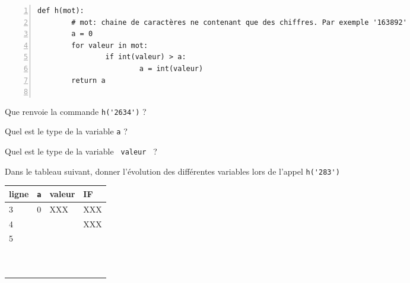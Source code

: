 \documentclass[a4paper,12pt,openany]{book}
\begin{document}
\begin{minipage}{9cm}
\begin{lstlisting}[numbers=left]
def h(mot):
		# mot: chaine de caractères ne contenant que des chiffres. Par exemple '163892' 
		a = 0
		for valeur in mot:
				if int(valeur) > a:
						a = int(valeur)
		return a
		
\end{lstlisting}

\begin{liste}
	\item 	Que renvoie la commande \verb+h('2634')+ ? \dotfill
	
	\dotfill
	
	\item Quel est le type de la variable \verb+a+ ? \dotfill
	
	\item Quel est le type de la variable \verb+ valeur + ? \dotfill
	 
	\end{liste}
\end{minipage}
\begin{minipage}{9cm}
\begin{liste}
	\item Dans le tableau suivant, donner l'évolution des différentes variables lors de l'appel \verb+h('283')+
	
\renewcommand{\arraystretch}{1.2}	
\begin{tabular}{|p{1.5cm}|p{1cm}|p{2cm}|p{2cm}|}
\hline
ligne & \verb+a+ & valeur & IF  \\ \hline
3 & 0 & XXX&XXX\\ \hline
4 &  & &XXX\\ \hline
5 & & &\\ \hline
 & & &\\ \hline
 & & &\\ \hline
 & & &\\ \hline
 & & &\\ \hline
 & & &\\ \hline
 & & &\\ \hline
 & & &\\ \hline
 & & &\\ \hline
 & & &\\ \hline
 & & &\\ \hline


\end{tabular}	
	
\end{liste}
\end{minipage}	
\end{document}
